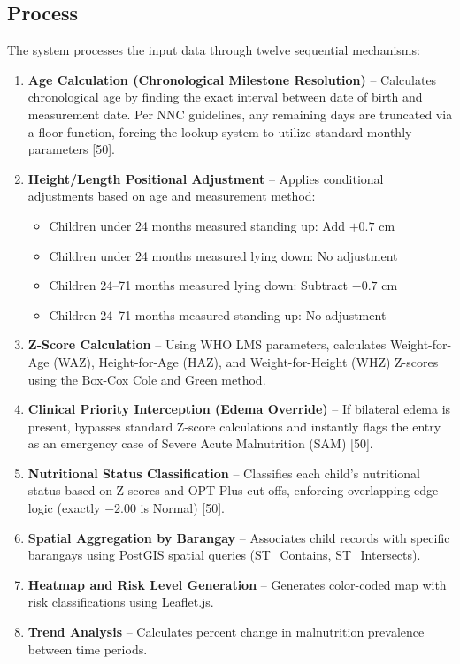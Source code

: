 \documentclass[12pt, a4paper]{report}
\begin{document}
\subsection{Process}
\label{subsec:process}
The system processes the input data through twelve sequential mechanisms:
\begin{enumerate}
    \item \textbf{Age Calculation (Chronological Milestone Resolution)} -- Calculates chronological age by finding the exact interval between date of birth and measurement date. Per NNC guidelines, any remaining days are truncated via a floor function, forcing the lookup system to utilize standard monthly parameters [50].
    \item \textbf{Height/Length Positional Adjustment} -- Applies conditional adjustments based on age and measurement method:
    \begin{itemize}
        \item Children under 24 months measured standing up: Add \(+0.7\) cm
        \item Children under 24 months measured lying down: No adjustment
        \item Children 24--71 months measured lying down: Subtract \(-0.7\) cm
        \item Children 24--71 months measured standing up: No adjustment
    \end{itemize}
    \item \textbf{Z-Score Calculation} -- Using WHO LMS parameters, calculates Weight-for-Age (WAZ), Height-for-Age (HAZ), and Weight-for-Height (WHZ) Z-scores using the Box-Cox Cole and Green method.
    \item \textbf{Clinical Priority Interception (Edema Override)} -- If bilateral edema is present, bypasses standard Z-score calculations and instantly flags the entry as an emergency case of Severe Acute Malnutrition (SAM) [50].
    \item \textbf{Nutritional Status Classification} -- Classifies each child's nutritional status based on Z-scores and OPT Plus cut-offs, enforcing overlapping edge logic (exactly \(-2.00\) is Normal) [50].
    \item \textbf{Spatial Aggregation by Barangay} -- Associates child records with specific barangays using PostGIS spatial queries (ST\_Contains, ST\_Intersects).
    \item \textbf{Heatmap and Risk Level Generation} -- Generates color-coded map with risk classifications using Leaflet.js.
    \item \textbf{Trend Analysis} -- Calculates percent change in malnutrition prevalence between time periods.

\end{enumerate}
\end{document}
